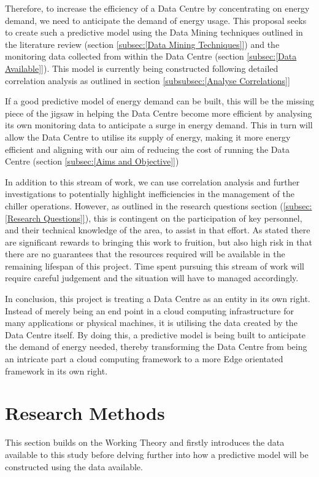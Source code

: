 \documentclass[12pt]{scrartcl}
\begin{document}
Therefore, to increase the efficiency of a Data Centre by concentrating on energy demand, we need to anticipate the demand of energy usage. This proposal seeks to create such a predictive model using the Data Mining techniques outlined in the literature review (section \ref{subsec:[Data Mining Techniques]}) and the monitoring data collected from within the Data Centre (section \ref{subsec:[Data Available]}). This model is currently being constructed following detailed correlation analysis as outlined in section \ref{subsubsec:[Analyse Correlations]}

If a good predictive model of energy demand can be built, this will be the missing piece of the jigsaw in helping the Data Centre become more efficient by analysing its own monitoring data to anticipate a surge in energy demand. This in turn will allow the Data Centre to utilise its supply of energy, making it more energy efficient and aligning with our aim of reducing the cost of running the Data Centre (section \ref{subsec:[Aims and Objective]})

In addition to this stream of work, we can use correlation analysis and further investigations to potentially highlight inefficiencies in the management of the chiller operations. However, as outlined in the research questions section (\ref{subsec:[Research Questions]}), this is contingent on the participation of key personnel, and their technical knowledge of the area, to assist in that effort. As stated there are significant rewards to bringing this work to fruition, but also high risk in that there are no guarantees that the resources required will be available in the remaining lifespan of this project. Time spent pursuing this stream of work will require careful judgement and the situation will have to managed accordingly.     

In conclusion, this project is treating a Data Centre as an entity in its own right. Instead of merely being an end point in a cloud computing infrastructure for many applications or physical machines, it is utilising the data created by the Data Centre itself. By doing this, a predictive model is being built to anticipate the demand of energy needed, thereby transforming the Data Centre from being an intricate part a cloud computing framework to a more Edge orientated framework in its own right.     

\section{Research Methods}
\label{sec:[Research Methods]}
This section builds on the Working Theory and firstly introduces the data available to this study before delving further into how a predictive model will be constructed using the data available.
\end{document}
